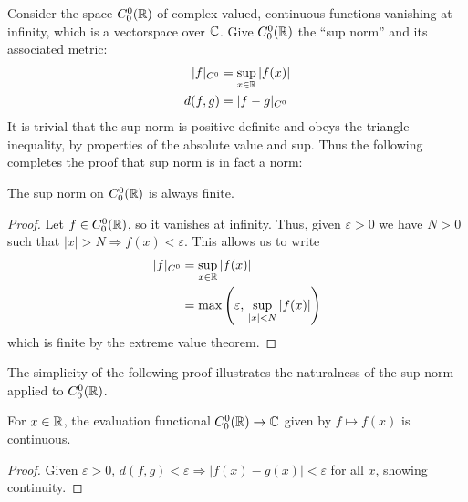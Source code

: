       Consider the space $C^0_0(\mathbb{R})$ of complex-valued, continuous functions vanishing at infinity, which is a vectorspace over $\mathbb{C}$.
      Give $C^0_0(\mathbb{R})$ the ``sup norm'' and its associated metric:
      \begin{align*}
        |f|_{C^0} &= \sup_{x\in\mathbb{R}}|f(x)|\\
        d(f,g) &= |f-g|_{C^0}
      \end{align*}
      It is trivial that the sup norm is positive-definite and obeys the triangle inequality, by properties of the absolute value and sup.
      Thus the following completes the proof that sup norm is in fact a norm:
      \begin{claim}
        The sup norm on $C^0_0(\mathbb{R})$ is always finite.
        \begin{proof}
          Let $f\in C^0_0(\mathbb{R})$, so it vanishes at infinity.
          Thus, given $\varepsilon>0$ we have $N>0$ such that $|x|>N\Rightarrow f(x)<\varepsilon$.
          This allows us to write
          \begin{align*}
            |f|_{C^0} &= \sup_{x\in\mathbb{R}}|f(x)|\\
            &= \max\left(\varepsilon,\,\sup_{|x|<N}|f(x)|\right)
          \end{align*}
          which is finite by the extreme value theorem.
        \end{proof}
      \end{claim}

      The simplicity of the following proof illustrates the naturalness of the sup norm applied to $C^0_0(\mathbb{R})$.
      \begin{claim}
        For $x\in\mathbb{R}$, the evaluation functional $C^0_0(\mathbb{R})\rightarrow\mathbb{C}$ given by $f\mapsto f(x)$ is continuous.
        \begin{proof}
          Given $\varepsilon > 0$, $d(f,g)<\varepsilon \Rightarrow |f(x)-g(x)|<\varepsilon$ for all $x$, showing continuity.
        \end{proof}
      \end{claim}

